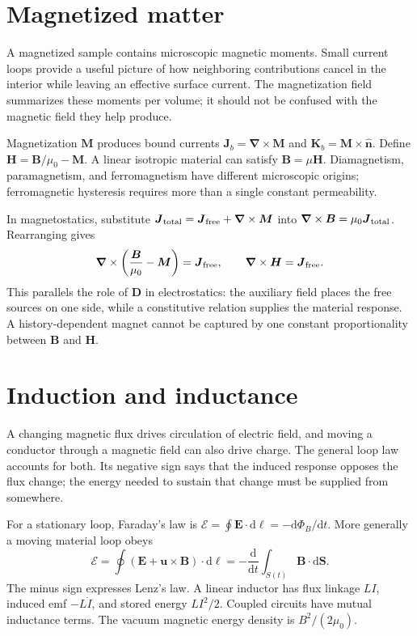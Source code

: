 \documentclass[11pt,oneside]{book}
\newcommand{\dd}{\mathrm{d}}
\newcommand{\vect}[1]{\boldsymbol{#1}}
\newcommand{\grad}{\boldsymbol{\nabla}}
\newcommand{\od}[2]{\frac{\dd #1}{\dd #2}}
\newcommand{\mun}{\mu_0}
\theoremstyle{reviewstyle}
\begin{document}
\section{Magnetized matter}
A magnetized sample contains microscopic magnetic moments. Small current loops provide a useful picture of how neighboring contributions cancel in the interior while leaving an effective surface current. The magnetization field summarizes these moments per volume; it should not be confused with the magnetic field they help produce.

Magnetization $\vect M$ produces bound currents $\vect J_b=\grad\times\vect M$ and $\vect K_b=\vect M\times\hat{\vect n}$. Define $\vect H=\vect B/\mun-\vect M$. A linear isotropic material can satisfy $\vect B=\mu\vect H$. Diamagnetism, paramagnetism, and ferromagnetism have different microscopic origins; ferromagnetic hysteresis requires more than a single constant permeability.

In magnetostatics, substitute $\vect J_{\rm total}=\vect J_{\rm free}+\grad\times\vect M$ into $\grad\times\vect B=\mun\vect J_{\rm total}$. Rearranging gives
\begin{equation}
\grad\times\left(\frac{\vect B}{\mun}-\vect M\right)=\vect J_{\rm free},
\qquad \grad\times\vect H=\vect J_{\rm free}.
\end{equation}
This parallels the role of $\vect D$ in electrostatics: the auxiliary field places the free sources on one side, while a constitutive relation supplies the material response. A history-dependent magnet cannot be captured by one constant proportionality between $\vect B$ and $\vect H$.

\section{Induction and inductance}
A changing magnetic flux drives circulation of electric field, and moving a conductor through a magnetic field can also drive charge. The general loop law accounts for both. Its negative sign says that the induced response opposes the flux change; the energy needed to sustain that change must be supplied from somewhere.

For a stationary loop, Faraday's law is $\mathcal E=\oint\vect E\cdot\dd\vect\ell=-\dd\Phi_B/\dd t$. More generally a moving material loop obeys
\begin{equation}\mathcal E=\oint(\vect E+\vect u\times\vect B)\cdot\dd\vect\ell=-\od{}{t}\int_{S(t)}\vect B\cdot\dd\vect S.\end{equation}
The minus sign expresses Lenz's law. A linear inductor has flux linkage $LI$, induced emf $-L\dot I$, and stored energy $LI^2/2$. Coupled circuits have mutual inductance terms. The vacuum magnetic energy density is $B^2/(2\mun)$.
\end{document}
